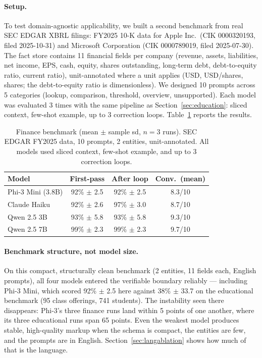 \documentclass[11pt,a4paper]{article}
\begin{document}
\paragraph{Setup.} To test domain-agnostic applicability, we built a second benchmark from real SEC EDGAR XBRL filings: FY2025 10-K data for Apple Inc.\ (CIK 0000320193, filed 2025-10-31) and Microsoft Corporation (CIK 0000789019, filed 2025-07-30). The fact store contains 11 financial fields per company (revenue, assets, liabilities, net income, EPS, cash, equity, shares outstanding, long-term debt, debt-to-equity ratio, current ratio), unit-annotated where a unit applies (USD, USD/shares, shares; the debt-to-equity ratio is dimensionless). We designed 10 prompts across 5 categories (lookup, comparison, threshold, overview, unsupported). Each model was evaluated 3 times with the same pipeline as Section~\ref{sec:education}: sliced context, few-shot example, up to 3 correction loops. Table~\ref{tab:finance} reports the results.

\begin{table}[h]
\centering
\small
\begin{tabular}{lccc}
\toprule
\textbf{Model} & \textbf{First-pass} & \textbf{After loop} & \textbf{Conv.\ (mean)} \\
\midrule
Phi-3 Mini (3.8B) & 92\% $\pm$ 2.5 & 92\% $\pm$ 2.5 & 8.3/10 \\
Claude Haiku & 92\% $\pm$ 2.6 & 97\% $\pm$ 3.0 & 8.7/10 \\
Qwen 2.5 3B & 93\% $\pm$ 5.8 & 93\% $\pm$ 5.8 & 9.3/10 \\
Qwen 2.5 7B & 99\% $\pm$ 2.3 & 99\% $\pm$ 2.3 & 9.7/10 \\
\bottomrule
\end{tabular}
\caption{Finance benchmark (mean $\pm$ sample sd, $n{=}3$ runs). SEC EDGAR FY2025 data, 10 prompts, 2 entities, unit-annotated. All models used sliced context, few-shot example, and up to 3 correction loops.}
\label{tab:finance}
\end{table}

\paragraph{Benchmark structure, not model size.} On this compact, structurally clean benchmark (2 entities, 11 fields each, English prompts), all four models entered the verifiable boundary reliably --- including Phi-3 Mini, which scored 92\% $\pm$ 2.5 here against 38\% $\pm$ 33.7 on the educational benchmark (95 class offerings, 741 students). The instability seen there disappears: Phi-3's three finance runs land within 5 points of one another, where its three educational runs span 65 points. Even the weakest model produces stable, high-quality markup when the schema is compact, the entities are few, and the prompts are in English. Section~\ref{sec:langablation} shows how much of that is the language.
\end{document}
